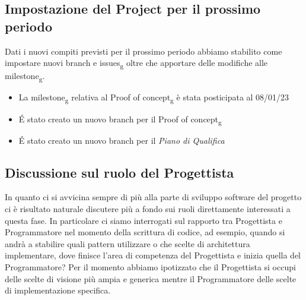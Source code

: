 \subsection{Impostazione del Project per il prossimo periodo}
Dati i nuovi compiti previsti per il prossimo periodo abbiamo stabilito come impostare nuovi branch e issues\textsubscript{g} oltre che apportare delle modifiche alle milestone\textsubscript{g}.
\begin{itemize}
	\item La milestone\textsubscript{g} relativa al Proof of concept\textsubscript{g} è stata posticipata al 08/01/23
	\item É stato creato un nuovo branch per il Proof of concept\textsubscript{g}
	\item É stato creato un nuovo branch per il \textit{Piano di Qualifica}
\end{itemize}

\subsection{Discussione sul ruolo del Progettista}
In quanto ci si avvicina sempre di più alla parte di sviluppo software del progetto ci è risultato naturale discutere più a fondo sui ruoli direttamente interessati a questa fase.
\newline In particolare ci siamo interrogati sul rapporto tra Progettista e Programmatore nel momento della scrittura di codice, ad esempio, quando si andrà a stabilire quali pattern utilizzare o che scelte di architettura implementare, dove finisce l'area di competenza del Progettista e inizia quella del Programmatore?
\newline Per il momento abbiamo ipotizzato che il Progettista si occupi delle scelte di visione più ampia e generica mentre il Programmatore delle scelte di implementazione specifica.